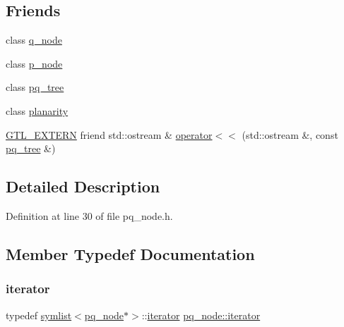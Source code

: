 \subsection*{Friends}
\begin{DoxyCompactItemize}
\item 
class \mbox{\hyperlink{classpq__node_ab10214fc73d6d72fa7ac390344a4fa46}{q\+\_\+node}}
\item 
class \mbox{\hyperlink{classpq__node_a97e0a0034637eb5933f88c413aa715c6}{p\+\_\+node}}
\item 
class \mbox{\hyperlink{classpq__node_a0a5be4bb438c891059fae98f607f2a9c}{pq\+\_\+tree}}
\item 
class \mbox{\hyperlink{classpq__node_ab6a02224dbc06343d95919289aec77c8}{planarity}}
\item 
\mbox{\hyperlink{_g_t_l_8h_a014cd1e9b3e67a78ae433eda95c8fd25}{G\+T\+L\+\_\+\+E\+X\+T\+E\+RN}} friend std\+::ostream \& \mbox{\hyperlink{classpq__node_a2db830bf75339bd39c819c231c03769b}{operator$<$$<$}} (std\+::ostream \&, const \mbox{\hyperlink{classpq__tree}{pq\+\_\+tree}} \&)
\end{DoxyCompactItemize}


\subsection{Detailed Description}


Definition at line 30 of file pq\+\_\+node.\+h.



\subsection{Member Typedef Documentation}
\mbox{\label{classpq__node_a34898c9eb1527787c07e8ebefd6bfba5}} 
\subsubsection{\texorpdfstring{iterator}{iterator}}
{\footnotesize\ttfamily typedef \mbox{\hyperlink{classsymlist}{symlist}}$<$\mbox{\hyperlink{classpq__node}{pq\+\_\+node}}$\ast$$>$\+::\mbox{\hyperlink{classpq__node_a34898c9eb1527787c07e8ebefd6bfba5}{iterator}} \mbox{\hyperlink{classpq__node_a34898c9eb1527787c07e8ebefd6bfba5}{pq\+\_\+node\+::iterator}}\hspace{0.3cm}{\ttfamily [protected]}}




